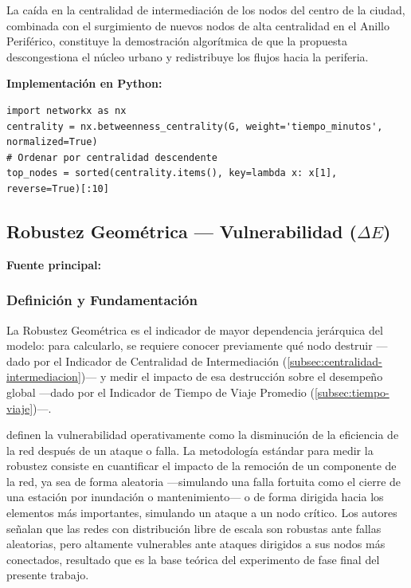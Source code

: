 La caída en la centralidad de intermediación de los nodos del centro de la
ciudad,
combinada con el surgimiento de nuevos nodos de alta centralidad en el Anillo
Periférico, constituye la demostración algorítmica de que la propuesta
descongestiona
el núcleo urbano y redistribuye los flujos hacia la periferia.
 
\textbf{Implementación en Python:}
 
\begin{lstlisting}[style=estiloPython, caption={Cálculo de Centralidad de Intermediación con NetworkX.}, label={lst:betweenness}]
import networkx as nx
centrality = nx.betweenness_centrality(G, weight='tiempo_minutos', normalized=True)
# Ordenar por centralidad descendente
top_nodes = sorted(centrality.items(), key=lambda x: x[1], reverse=True)[:10]
\end{lstlisting}


\subsection{Robustez Geométrica --- Vulnerabilidad \texorpdfstring{($\Delta E$)}{(Delta E)}}
\label{subsec:robustez-geometrica}
 
\textbf{Fuente principal:} \citet{loterovélez2014}
 
\subsubsection{Definición y Fundamentación}
 
La Robustez Geométrica es el indicador de mayor dependencia jerárquica del
modelo: para calcularlo, se requiere conocer previamente qué nodo destruir
---dado
por el Indicador de Centralidad de Intermediación
(\autoref{subsec:centralidad-intermediacion})--- y medir el impacto de esa
destrucción
sobre el desempeño global ---dado por el Indicador de Tiempo de Viaje Promedio
(\autoref{subsec:tiempo-viaje})---.
 
\citet{loterovélez2014} definen la vulnerabilidad operativamente como la
disminución de la eficiencia de la red después de un ataque o falla. La
metodología
estándar para medir la robustez consiste en cuantificar el impacto de la
remoción de
un componente de la red, ya sea de forma aleatoria ---simulando una falla
fortuita
como el cierre de una estación por inundación o mantenimiento--- o de forma
dirigida
hacia los elementos más importantes, simulando un ataque a un nodo crítico. Los
autores señalan que las redes con distribución libre de escala son robustas ante
fallas aleatorias, pero altamente vulnerables ante ataques dirigidos a sus nodos
más
conectados, resultado que es la base teórica del experimento de fase final del
presente trabajo.
 
